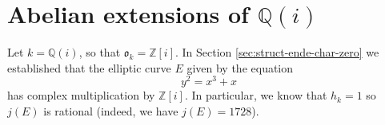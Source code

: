 \newpage
\section{Abelian extensions of $\mathbb{Q}(i)$}
\label{sec:abel-extens-Qi}

Let $k = \mathbb{Q}(i)$, so that $\mathfrak{o}_{k} = \mathbb{Z}[i]$.  In Section
\ref{sec:struct-ende-char-zero} we established that the elliptic curve $E$ given by
the equation
\begin{equation*}
  y^{2} = x^{3} + x
\end{equation*}
has complex multiplication by $\mathbb{Z}[i]$.  In particular, we know that $h_{k} =
1$ so $j(E)$ is rational (indeed, we have $j(E) = 1728$).
